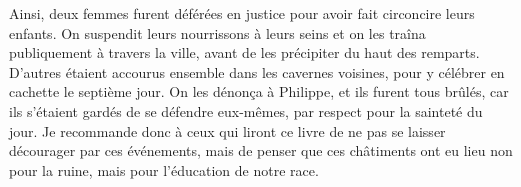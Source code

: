 Ainsi, deux femmes furent déférées en justice pour avoir fait circoncire leurs enfants.
On suspendit leurs nourrissons à leurs seins
	et on les traîna publiquement à travers la ville,
	avant de les précipiter du haut des remparts.
D’autres étaient accourus ensemble dans les cavernes voisines,
	pour y célébrer en cachette le septième jour.
On les dénonça à Philippe, et ils furent tous brûlés,
	car ils s’étaient gardés de se défendre eux-mêmes,
	par respect pour la sainteté du jour.
Je recommande donc à ceux qui liront ce livre
		de ne pas se laisser décourager par ces événements,
	mais de penser que ces châtiments ont eu lieu
	non pour la ruine, mais pour l’éducation de notre race.
